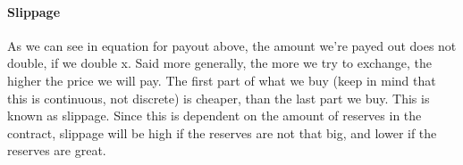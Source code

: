 \paragraph{Slippage}
As we can see in equation for payout above, the amount we're payed out does not
double, if we double x. Said more generally, the more we try to exchange, the
higher the price we will pay. The first part of what we buy (keep in mind that
this is continuous, not discrete) is cheaper, than the last part we buy. This is
known as slippage. Since this is dependent on the amount of reserves in the
contract, slippage will be high if the reserves are not that big, and lower if
the reserves are great.
